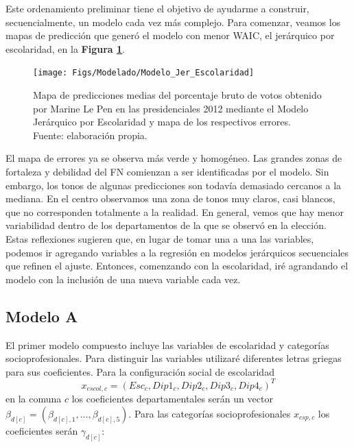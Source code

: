 Este ordenamiento preliminar tiene el objetivo de ayudarme a construir, secuencialmente, un modelo cada vez más complejo. Para comenzar, veamos los mapas de predicción que generó el modelo con menor WAIC, el jerárquico por escolaridad, en la \textbf{Figura \ref{fig:Modelo_Jer_Escolaridad}}.

\begin{figure}[h]
	\centering
	\texttt{[image: Figs/Modelado/Modelo\_Jer\_Escolaridad]}
	\caption{Mapa de predicciones medias del porcentaje bruto de votos obtenido por Marine Le Pen en las presidenciales 2012 mediante el Modelo Jerárquico por Escolaridad y mapa de los respectivos errores. Fuente: elaboración propia.}
	\label{fig:Modelo_Jer_Escolaridad}
\end{figure}

El mapa de errores ya se observa más verde y homogéneo. Las grandes zonas de fortaleza y debilidad del FN comienzan a ser identificadas por el modelo. Sin embargo, los tonos de algunas predicciones son todavía demasiado cercanos a la mediana. En el centro observamos una zona de tonos muy claros, casi blancos, que no corresponden totalmente a la realidad. En general, vemos que hay menor variabilidad dentro de los departamentos de la que se observó en la elección.\\ 

Estas reflexiones sugieren que, en lugar de tomar una a una las variables, podemos ir agregando variables a la regresión en modelos jerárquicos secuenciales que refinen el ajuste. Entonces, comenzando con la escolaridad, iré agrandando el modelo con la inclusión de una nueva variable cada vez.

\subsection*{Modelo A}

El primer modelo compuesto incluye las variables de escolaridad y categorías socioprofesionales. Para distinguir las variables utilizaré diferentes letras griegas para sus coeficientes. Para la configuración social de escolaridad 
\[x_{escol,c} = (Esc_c,Dip1_c,Dip2_c,Dip3_c,Dip4_c)^T\]
en la comuna $c$ los coeficientes departamentales serán un vector $\beta_{d[c]} = (\beta_{d[c],1},\dots,\beta_{d[c],5})$. Para las categorías socioprofesionales $x_{csp,c}$ los coeficientes serán $\gamma_{d[c]}$:


